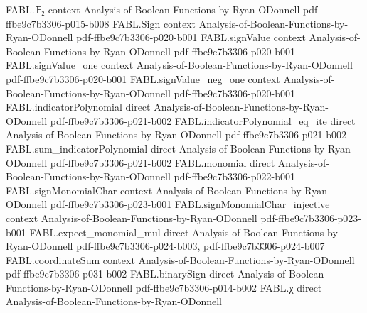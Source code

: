 \begin{theorem}
\label{FABL.exists_condorcetMajorityThresholdBounds}
\leanok
{}
\proofstep
  {FABL.𝔽₂}
  {context}
  {Analysis-of-Boolean-Functions-by-Ryan-ODonnell}
  {pdf-ffbe9c7b3306-p015-b008}
\proofstep
  {FABL.Sign}
  {context}
  {Analysis-of-Boolean-Functions-by-Ryan-ODonnell}
  {pdf-ffbe9c7b3306-p020-b001}
\proofstep
  {FABL.signValue}
  {context}
  {Analysis-of-Boolean-Functions-by-Ryan-ODonnell}
  {pdf-ffbe9c7b3306-p020-b001}
\proofstep
  {FABL.signValue_one}
  {context}
  {Analysis-of-Boolean-Functions-by-Ryan-ODonnell}
  {pdf-ffbe9c7b3306-p020-b001}
\proofstep
  {FABL.signValue_neg_one}
  {context}
  {Analysis-of-Boolean-Functions-by-Ryan-ODonnell}
  {pdf-ffbe9c7b3306-p020-b001}
\proofstep
  {FABL.indicatorPolynomial}
  {direct}
  {Analysis-of-Boolean-Functions-by-Ryan-ODonnell}
  {pdf-ffbe9c7b3306-p021-b002}
\proofstep
  {FABL.indicatorPolynomial_eq_ite}
  {direct}
  {Analysis-of-Boolean-Functions-by-Ryan-ODonnell}
  {pdf-ffbe9c7b3306-p021-b002}
\proofstep
  {FABL.sum_indicatorPolynomial}
  {direct}
  {Analysis-of-Boolean-Functions-by-Ryan-ODonnell}
  {pdf-ffbe9c7b3306-p021-b002}
\proofstep
  {FABL.monomial}
  {direct}
  {Analysis-of-Boolean-Functions-by-Ryan-ODonnell}
  {pdf-ffbe9c7b3306-p022-b001}
\proofstep
  {FABL.signMonomialChar}
  {context}
  {Analysis-of-Boolean-Functions-by-Ryan-ODonnell}
  {pdf-ffbe9c7b3306-p023-b001}
\proofstep
  {FABL.signMonomialChar_injective}
  {context}
  {Analysis-of-Boolean-Functions-by-Ryan-ODonnell}
  {pdf-ffbe9c7b3306-p023-b001}
\proofstep
  {FABL.expect_monomial_mul}
  {direct}
  {Analysis-of-Boolean-Functions-by-Ryan-ODonnell}
  {pdf-ffbe9c7b3306-p024-b003,
    pdf-ffbe9c7b3306-p024-b007}
\proofstep
  {FABL.coordinateSum}
  {context}
  {Analysis-of-Boolean-Functions-by-Ryan-ODonnell}
  {pdf-ffbe9c7b3306-p031-b002}
\proofstep
  {FABL.binarySign}
  {direct}
  {Analysis-of-Boolean-Functions-by-Ryan-ODonnell}
  {pdf-ffbe9c7b3306-p014-b002}
\proofstep
  {FABL.χ}
  {direct}
  {Analysis-of-Boolean-Functions-by-Ryan-ODonnell}

\end{theorem}
